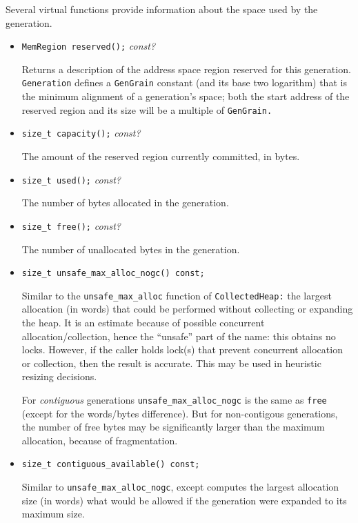 \documentclass{article}
\begin{document}
Several virtual functions provide information about the space used by
the generation.
\begin{itemize}
\item {\tt MemRegion reserved();} {\em const?}

Returns a description of the address space region reserved for this
generation.  {\tt Generation} defines a {\tt GenGrain} constant (and its
base two logarithm) that is the minimum alignment of a generation's
space; both the start address of the reserved region and its size will
be a multiple of {\tt GenGrain.}
  
\item {\tt size\_t capacity();} {\em const?}

The amount of the reserved region currently committed, in bytes.

\item {\tt size\_t used();} {\em const?}

The number of bytes allocated in the generation.

\item {\tt size\_t free();} {\em const?}

The number of unallocated bytes in the generation.

\item {\tt size\_t unsafe\_max\_alloc\_nogc() const;}

Similar to the {\tt unsafe\_max\_alloc} function of {\tt CollectedHeap:}
the largest allocation (in words) that could be performed without
collecting or expanding the heap.    It is an estimate because of possible concurrent 
allocation/collection, hence the ``unsafe'' part of the name: this
obtains no locks.  However, if the caller holds lock(s) that prevent
concurrent allocation or collection, then the result is accurate.
This may be used in heuristic resizing decisions.

For {\em contiguous} generations {\tt unsafe\_max\_alloc\_nogc} is the
same as {\tt free} (except for the words/bytes difference).  But for
non-contigous generations, the number of free bytes may be
significantly larger than the maximum allocation, because of
fragmentation.

\item {\tt size\_t contiguous\_available() const;}

Similar to {\tt unsafe\_max\_alloc\_nogc}, except computes the largest
allocation size (in words) what would be allowed if the generation were
expanded to its maximum size.


\end{itemize}
\end{document}

